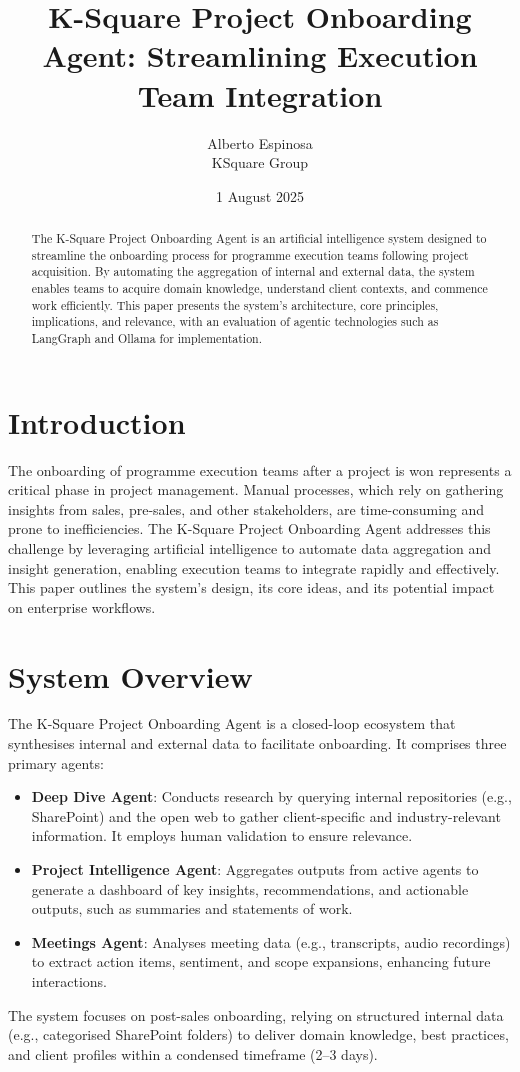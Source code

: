 \documentclass{article}
\begin{document}
\title{K-Square Project Onboarding Agent: Streamlining Execution Team Integration}
\author{Alberto Espinosa \\ KSquare Group}
\date{1 August 2025}
\maketitle

\begin{abstract}
The K-Square Project Onboarding Agent is an artificial intelligence system designed to streamline the onboarding process for programme execution teams following project acquisition. By automating the aggregation of internal and external data, the system enables teams to acquire domain knowledge, understand client contexts, and commence work efficiently. This paper presents the system’s architecture, core principles, implications, and relevance, with an evaluation of agentic technologies such as LangGraph and Ollama for implementation.
\end{abstract}

\section{Introduction}
The onboarding of programme execution teams after a project is won represents a critical phase in project management. Manual processes, which rely on gathering insights from sales, pre-sales, and other stakeholders, are time-consuming and prone to inefficiencies. The K-Square Project Onboarding Agent addresses this challenge by leveraging artificial intelligence to automate data aggregation and insight generation, enabling execution teams to integrate rapidly and effectively. This paper outlines the system’s design, its core ideas, and its potential impact on enterprise workflows.

\section{System Overview}
The K-Square Project Onboarding Agent is a closed-loop ecosystem that synthesises internal and external data to facilitate onboarding. It comprises three primary agents:
\begin{itemize}
    \item \textbf{Deep Dive Agent}: Conducts research by querying internal repositories (e.g., SharePoint) and the open web to gather client-specific and industry-relevant information. It employs human validation to ensure relevance.
    \item \textbf{Project Intelligence Agent}: Aggregates outputs from active agents to generate a dashboard of key insights, recommendations, and actionable outputs, such as summaries and statements of work.
    \item \textbf{Meetings Agent}: Analyses meeting data (e.g., transcripts, audio recordings) to extract action items, sentiment, and scope expansions, enhancing future interactions.
\end{itemize}
The system focuses on post-sales onboarding, relying on structured internal data (e.g., categorised SharePoint folders) to deliver domain knowledge, best practices, and client profiles within a condensed timeframe (2–3 days).
\end{document}
